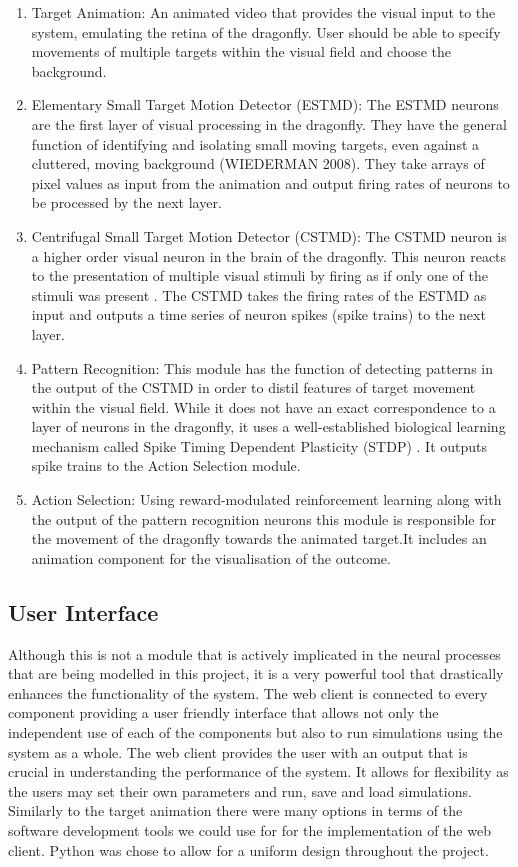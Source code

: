 \documentclass[a4paper,11pt]{article}
\begin{document}
\begin{enumerate}
\item{Target Animation:} An animated video that provides the visual input to the system, emulating the retina of the dragonfly. User should be able to specify movements of multiple targets within the visual field and choose the background.
\item{Elementary Small Target Motion Detector (ESTMD):} The ESTMD neurons are the first layer of visual processing in the dragonfly. They have the general function of identifying and isolating small moving targets, even against a cluttered, moving background (WIEDERMAN 2008). They take arrays of pixel values as input from the animation and output firing rates of neurons to be processed by the next layer.
\item{Centrifugal Small Target Motion Detector (CSTMD):} The CSTMD neuron is a higher order visual neuron in the brain of the dragonfly. This neuron reacts to the presentation of multiple visual stimuli by firing as if only one of the stimuli was present \cite{w13}. The CSTMD takes the firing rates of the ESTMD as input and outputs a time series of neuron spikes (spike trains) to the next layer.
\item{Pattern Recognition:} This module has the function of detecting patterns in the output of the CSTMD in order to distil features of target movement within the visual field. While it does not have an exact correspondence to a layer of neurons in the dragonfly, it uses a well-established biological learning mechanism called Spike Timing Dependent Plasticity (STDP) \cite{stdp1}\cite{stdp2}. It outputs spike trains to the Action Selection module.
\item{Action Selection:} Using reward-modulated reinforcement learning along with the output of the pattern recognition neurons this module is responsible for the movement of the dragonfly towards the animated target.It includes an animation component for the visualisation of the outcome.
\end{enumerate}

\subsection{User Interface}
Although this is not a module that is actively implicated in the neural processes that are being modelled in this project, it is a very powerful tool that drastically enhances the functionality of the system. The web client is connected to every component providing a user friendly interface that allows not only the independent use of each of the components but also to run simulations using the system as a whole. The web client provides the user with an output that is crucial in understanding the performance of the system. It allows for flexibility as the users may set their own parameters and run, save and load simulations. Similarly to the target animation there were many options in terms of the software development tools we could use for for the implementation of the web client. Python was chose to allow for a uniform design throughout the project.
\end{document}
